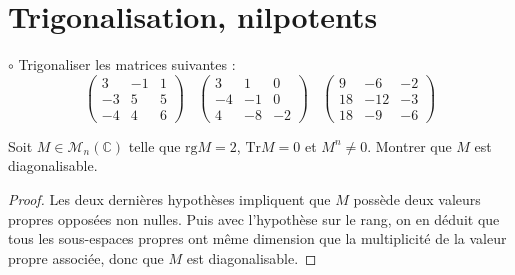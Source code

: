 \documentclass[french,a4paper]{article}
\newcommand{\C}{\mathbb{C}}
\newcommand{\Tr}{\text{Tr}}
\theoremstyle{plain}
\theoremstyle{definition}
\theoremstyle{remark}
\begin{document}
\section{Trigonalisation, nilpotents}

\begin{ex}{$\circ$}
	Trigonaliser les matrices suivantes :
	$$\begin{pmatrix}
		3&-1&1\\
		-3&5&5\\
		-4&4&6
	\end{pmatrix}\ \ \ \
	\begin{pmatrix}
		3&1&0\\
		-4&-1&0\\
		4&-8&-2
	\end{pmatrix}\ \ \ \
	\begin{pmatrix}
		9&-6&-2\\
		18&-12&-3\\
		18&-9&-6
	\end{pmatrix}$$
\end{ex}

\begin{ex}{}
	Soit $M\in\mathcal{M}_n(\C)$ telle que $\text{rg}M=2$, $\Tr M=0$ et $M^n\ne 0$. Montrer que $M$ est diagonalisable.
\end{ex}
\begin{proof}
	Les deux dernières hypothèses impliquent que $M$ possède deux valeurs propres opposées non nulles. Puis avec l'hypothèse sur le rang, on en déduit que tous les sous-espaces propres ont même dimension que la multiplicité de la valeur propre associée, donc que $M$ est diagonalisable.
\end{proof}
\end{document}
